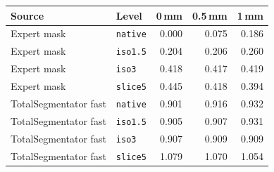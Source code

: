 \begin{tabular}{llrrr}
\toprule
Source & Level & 0\,mm & 0.5\,mm & 1\,mm \\
\midrule
Expert mask & \texttt{native} & 0.000 & 0.075 & 0.186 \\
Expert mask & \texttt{iso1.5} & 0.204 & 0.206 & 0.260 \\
Expert mask & \texttt{iso3} & 0.418 & 0.417 & 0.419 \\
Expert mask & \texttt{slice5} & 0.445 & 0.418 & 0.394 \\
\midrule
TotalSegmentator fast & \texttt{native} & 0.901 & 0.916 & 0.932 \\
TotalSegmentator fast & \texttt{iso1.5} & 0.905 & 0.907 & 0.931 \\
TotalSegmentator fast & \texttt{iso3} & 0.907 & 0.909 & 0.909 \\
TotalSegmentator fast & \texttt{slice5} & 1.079 & 1.070 & 1.054 \\
\bottomrule
\end{tabular}
